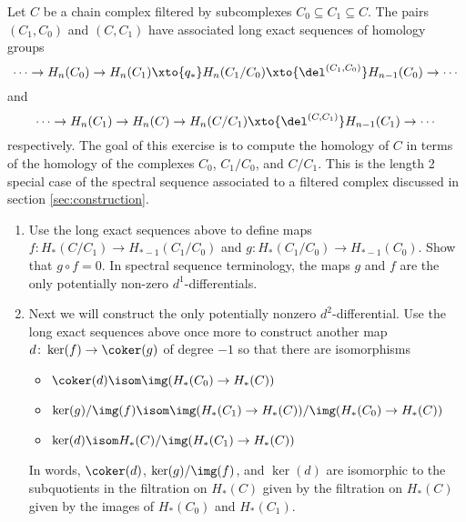 \begin{exercise}
	Let $C$ be a chain complex filtered by subcomplexes $C_0 \subseteq C_1 \subseteq C$.
	The pairs $(C_1, C_0)$ and $(C, C_1)$ have associated long exact sequences of homology groups
	\begin{equation}\label{ex2:les1}
		\cdots \to H_n(C_0) \to H_n(C_1) \xto{q_*} H_n(C_1 / C_0) \xto{\del^{(C_1, C_0)}} H_{n - 1}(C_0) \to \cdots
	\end{equation}
	and 
	\begin{equation}\label{ex2:les2}
		\cdots \to H_n(C_1) \to H_n(C) \to H_n(C / C_1) \xto{\del^{(C, C_1)}} H_{n - 1}(C_1) \to \cdots
	\end{equation}
	respectively.
	The goal of this exercise is to compute the homology of $C$ in terms of the homology of the complexes $C_0$, $C_1 / C_0$, and $C / C_1$.
	This is the length 2 special case of the spectral sequence associated to a filtered complex discussed in section \ref{sec:construction}.
	\begin{enumerate}
		\item Use the long exact sequences above to define maps $f\colon H_*(C / C_1) \to H_{* - 1}(C_1 / C_0)$ and $g\colon H_*(C_1 / C_0) \to H_{* - 1}(C_0)$.
			Show that $g \circ f = 0$.
			In spectral sequence terminology, the maps $g$ and $f$ are the only potentially non-zero $d^1$-differentials.
		\item Next we will construct the only potentially nonzero $d^2$-differential.
			Use the long exact sequences above once more to construct another map $d\colon \ker(f) \to \coker(g)$ of degree $-1$ so that there are isomorphisms
			\begin{itemize}
				\item $\coker(d) \isom \img(H_*(C_0) \to H_*(C))$
				\item $\ker(g) / \img(f) \isom \img(H_*(C_1) \to H_*(C)) / \img(H_*(C_0) \to H_*(C))$
				\item $\ker(d) \isom H_*(C) / \img(H_*(C_1) \to H_*(C))$
			\end{itemize}
			In words, $\coker(d)$, $\ker(g) / \img(f)$, and $\ker(d)$ are isomorphic to the subquotients in the filtration on $H_*(C)$ given by the filtration on $H_*(C)$ given by the images of $H_*(C_0)$ and $H_*(C_1)$.
	\end{enumerate}
\end{exercise}
